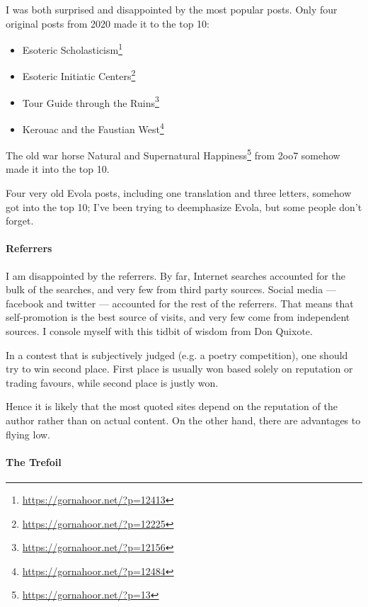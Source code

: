 I was both surprised and disappointed by the most popular posts. Only four original posts from 2020 made it to the top 10:

\begin{itemize}


\item Esoteric Scholasticism\footnote{\url{https://gornahoor.net/?p=12413}}

\item Esoteric Initiatic Centers\footnote{\url{https://gornahoor.net/?p=12225}}

\item Tour Guide through the Ruins\footnote{\url{https://gornahoor.net/?p=12156}}

\item Kerouac and the Faustian West\footnote{\url{https://gornahoor.net/?p=12484}}
\end{itemize}


The old war horse Natural and Supernatural Happiness\footnote{\url{https://gornahoor.net/?p=13}} from 2oo7 somehow made it into the top 10.

Four very old Evola posts, including one translation and three letters, somehow got into the top 10; I've been trying to deemphasize Evola, but some people don't forget.

\paragraph{Referrers}


I am disappointed by the referrers. By far, Internet searches accounted for the bulk of the searches, and very few from third party sources. Social media --- facebook and twitter --- accounted for the rest of the referrers. That means that self-promotion is the best source of visits, and very few come from independent sources. I console myself with this tidbit of wisdom from Don Quixote.

\begin{quotex}
In a contest that is subjectively judged (e.g. a poetry competition), one should try to win second place. First place is usually won based solely on reputation or trading favours, while second place is justly won.
\end{quotex}


Hence it is likely that the most quoted sites depend on the reputation of the author rather than on actual content. On the other hand, there are advantages to flying low.

\paragraph{The Trefoil}


